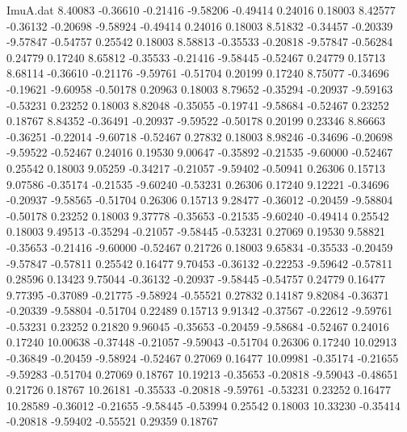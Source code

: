 \begin{filecontents}{ImuA.dat}
   8.40083   -0.36610   -0.21416   -9.58206   -0.49414    0.24016    0.18003
   8.42577   -0.36132   -0.20698   -9.58924   -0.49414    0.24016    0.18003
   8.51832   -0.34457   -0.20339   -9.57847   -0.54757    0.25542    0.18003
   8.58813   -0.35533   -0.20818   -9.57847   -0.56284    0.24779    0.17240
   8.65812   -0.35533   -0.21416   -9.58445   -0.52467    0.24779    0.15713
   8.68114   -0.36610   -0.21176   -9.59761   -0.51704    0.20199    0.17240
   8.75077   -0.34696   -0.19621   -9.60958   -0.50178    0.20963    0.18003
   8.79652   -0.35294   -0.20937   -9.59163   -0.53231    0.23252    0.18003
   8.82048   -0.35055   -0.19741   -9.58684   -0.52467    0.23252    0.18767
   8.84352   -0.36491   -0.20937   -9.59522   -0.50178    0.20199    0.23346
   8.86663   -0.36251   -0.22014   -9.60718   -0.52467    0.27832    0.18003
   8.98246   -0.34696   -0.20698   -9.59522   -0.52467    0.24016    0.19530
   9.00647   -0.35892   -0.21535   -9.60000   -0.52467    0.25542    0.18003
   9.05259   -0.34217   -0.21057   -9.59402   -0.50941    0.26306    0.15713
   9.07586   -0.35174   -0.21535   -9.60240   -0.53231    0.26306    0.17240
   9.12221   -0.34696   -0.20937   -9.58565   -0.51704    0.26306    0.15713
   9.28477   -0.36012   -0.20459   -9.58804   -0.50178    0.23252    0.18003
   9.37778   -0.35653   -0.21535   -9.60240   -0.49414    0.25542    0.18003
   9.49513   -0.35294   -0.21057   -9.58445   -0.53231    0.27069    0.19530
   9.58821   -0.35653   -0.21416   -9.60000   -0.52467    0.21726    0.18003
   9.65834   -0.35533   -0.20459   -9.57847   -0.57811    0.25542    0.16477
   9.70453   -0.36132   -0.22253   -9.59642   -0.57811    0.28596    0.13423
   9.75044   -0.36132   -0.20937   -9.58445   -0.54757    0.24779    0.16477
   9.77395   -0.37089   -0.21775   -9.58924   -0.55521    0.27832    0.14187
   9.82084   -0.36371   -0.20339   -9.58804   -0.51704    0.22489    0.15713
   9.91342   -0.37567   -0.22612   -9.59761   -0.53231    0.23252    0.21820
   9.96045   -0.35653   -0.20459   -9.58684   -0.52467    0.24016    0.17240
  10.00638   -0.37448   -0.21057   -9.59043   -0.51704    0.26306    0.17240
  10.02913   -0.36849   -0.20459   -9.58924   -0.52467    0.27069    0.16477
  10.09981   -0.35174   -0.21655   -9.59283   -0.51704    0.27069    0.18767
  10.19213   -0.35653   -0.20818   -9.59043   -0.48651    0.21726    0.18767
  10.26181   -0.35533   -0.20818   -9.59761   -0.53231    0.23252    0.16477
  10.28589   -0.36012   -0.21655   -9.58445   -0.53994    0.25542    0.18003
  10.33230   -0.35414   -0.20818   -9.59402   -0.55521    0.29359    0.18767

\end{filecontents}
